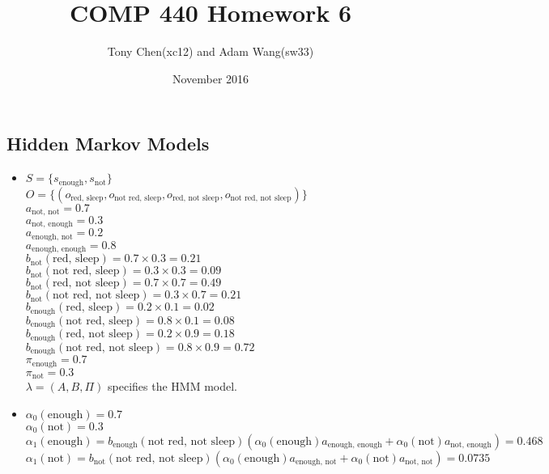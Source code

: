 \documentclass[11pt]{article}
\title{COMP 440 Homework 6}
\author{Tony Chen(xc12) and Adam Wang(sw33)}
\date{November 2016}
\begin{document}
\begin{onehalfspace}
\maketitle{}
\section{Hidden Markov Models}
\begin{itemize}
	\item
	$S = \{s_{\text{enough}},s_{\text{not}}\}$\\
	$O = \{(o_{\text{red, sleep}},o_{\text{not red, sleep}},o_{\text{red, not sleep}},o_{\text{not red, not sleep}})\}$\\
	$a_{\text{not, not}} = 0.7$\\
	$a_{\text{not, enough}} = 0.3$\\
	$a_{\text{enough, not}} = 0.2$\\
	$a_{\text{enough, enough}} = 0.8$\\
	$b_{\text{not}}(\text{red, sleep}) = 0.7\times0.3 = 0.21$\\
	$b_{\text{not}}(\text{not red, sleep}) = 0.3\times0.3 = 0.09$\\
	$b_{\text{not}}(\text{red, not sleep}) = 0.7\times0.7 = 0.49$\\
	$b_{\text{not}}(\text{not red, not sleep}) = 0.3\times0.7 = 0.21$\\
	$b_{\text{enough}}(\text{red, sleep}) = 0.2\times0.1 = 0.02$\\
	$b_{\text{enough}}(\text{not red, sleep}) = 0.8\times0.1 = 0.08$\\
	$b_{\text{enough}}(\text{red, not sleep}) = 0.2\times0.9 = 0.18$\\
	$b_{\text{enough}}(\text{not red, not sleep}) = 0.8\times0.9 = 0.72$\\
	$\pi_{\text{enough}} = 0.7$\\
	$\pi_{\text{not}} = 0.3$\\
	$\lambda = (A,B,\Pi)$ specifies the HMM model.
	\item
	$\alpha_0(\text{enough}) = 0.7$\\
	$\alpha_0(\text{not}) = 0.3$\\
	$\alpha_1(\text{enough}) = b_{\text{enough}}(\text{not red, not sleep})(\alpha_0(\text{enough})a_{\text{enough, enough}} + \alpha_0(\text{not})a_{\text{not, enough}}) = 0.468$\\
	$\alpha_1(\text{not}) = b_{\text{not}}(\text{not red, not sleep})(\alpha_0(\text{enough})a_{\text{enough, not}} + \alpha_0(\text{not})a_{\text{not, not}}) = 0.0735$\\

\end{itemize}
\end{onehalfspace}
\end{document}
